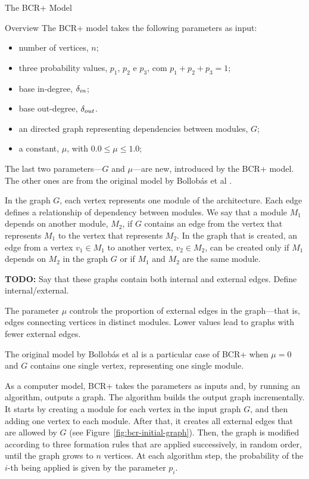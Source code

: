 \documentclass[11pt,twocolumn,a4paper,english]{article}
\newcommand{\TODO}{\textbf{TODO:} }
\begin{document}
\begin{section}{The BCR+ Model}
\begin{subsection}{Overview}
	The BCR+ model takes the following parameters as input: 
	\begin{itemize}
  \item number of vertices, $n$;
  \item three probability values, $p_1$, $p_2$ e $p_3$, com $p_1 + p_2 + p_3 = 1$;
  \item base in-degree, $\delta_{in}$;
  \item base out-degree, $\delta_{out}$.
  \item an directed graph representing dependencies between modules, $G$;
  \item a constant, $\mu$, with $0.0 \le \mu \le 1.0$;
  \end{itemize}
  The last two parameters---$G$ and  $\mu$---are new, introduced by the BCR+ model. The other ones are from the original model by Bollobás et al \cite{Bollobas2003}.
  
	In the graph $G$, each vertex represents one module of the architecture. Each edge defines a relationship of dependency between modules. We say that a module $M_1$ depends on another module, $M_2$, if $G$ contains an edge from the vertex that represents $M_1$ to the vertex that represents $M_2$. In the graph that is created, an edge from a vertex $v_1 \in M_1$ to another vertex, $v_2 \in M_2$, can be created only if $M_1$ depends on $M_2$ in the graph $G$ or if $M_1$ and $M_2$ are the same module.
	
		\TODO Say that these graphs contain both internal and external edges. Define internal/external.
		
	The parameter $\mu$ controls the proportion of external edges in the graph---that is, edges connecting vertices in distinct modules. Lower values lead to graphs with fewer external edges.
	
	The original model by Bollobás et al \cite{Bollobas2003} is a particular case of BCR+ when $\mu = 0$ and $G$ contains one single vertex, representing one single module.
	
	As a computer model, BCR+ takes the parameters as inputs and, by running an algorithm, outputs a graph. The algorithm builds the output graph incrementally. It starts by creating a module for each vertex in the input graph $G$, and then adding one vertex to each module. After that, it creates all external edges that are allowed by $G$ (see Figure~\ref{fig:bcr-initial-graph}). Then, the graph is modified according to three formation rules that are applied successively, in random order, until the graph grows to $n$ vertices. At each algorithm step, the probability of the $i$-th being applied is given by the parameter $p_i$.


\end{subsection}
\end{section}
\end{document}
